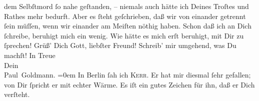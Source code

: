 \begin{ledgroupsized}[t]{13cm}
               dem Selbſtmord ſo nahe geſtanden, – niemals auch hätte ich Deines Troſtes und Rathes
                   mehr bedurft. Aber es ſteht geſchrieben, daß wir von einander getrennt ſein
               müſſen, wenn wir einander {\pb}am Meiſten nöthig haben.
               Schon daß ich an Dich ſchreibe, beruhigt mich ein wenig. Wie hätte es mich erſt
               beruhigt, mit Dir zu ſprechen!\pend
           \pstart
           Grüß’ Dich Gott, liebſter Freund! Schreib’ mir umgehend, was Du machſt!\pend
           \pstart
           In Treue {\\[\baselineskip]}Dein {\\[\baselineskip]}\spacefill\mbox{Paul Goldmann.}\pend
           \leftskip=0em{}\pstart
           \noindent{}In Berlin ſah ich \textsc{Kerr}. Er hat mir diesmal ſehr gefallen; von Dir ſpricht er mit echter Wärme. Es
                  iſt ein gutes Zeichen für ihn, daß er Dich verſteht.\pend
           
         
         \endnumbering{}\end{ledgroupsized}  \newcommand{\dateiname}{L02875}\newcommand{\titel}{Paul Goldmann an Arthur Schnitzler, 20. 5. [1899]}\newcommand{\editorInnen}{Martin Anton Müller und Laura Untner}
      